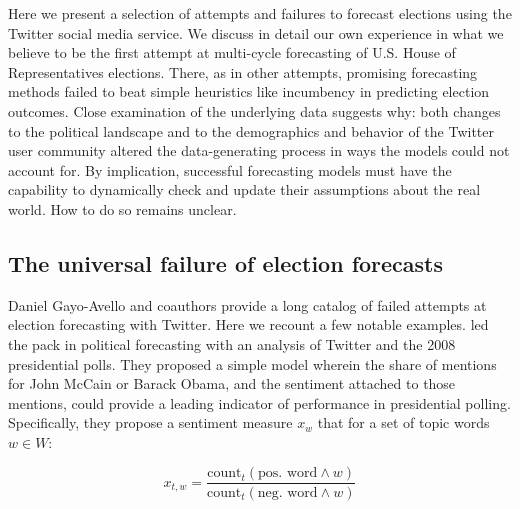 \documentclass{article}
\begin{document}
Here we present a selection of attempts and failures to forecast
elections using the Twitter social media service. We discuss in detail
our own experience in what we believe to be the first attempt at
multi-cycle forecasting of U.S. House of Representatives
elections. There, as in other attempts, promising forecasting methods
failed to beat simple heuristics like incumbency in predicting
election outcomes. Close examination of the underlying data suggests
why: both changes to the political landscape and to the demographics
and behavior of the Twitter user community altered the data-generating
process in ways the models could not account for. By implication,
successful forecasting models must have the capability to dynamically
check and update their assumptions about the real world. How to do so
remains unclear. 





\subsection{The universal failure of election forecasts}
\label{sec:univ-fail-elect}

Daniel Gayo-Avello and coauthors \citep{gayo2011limits,metaxas2011not}
provide a long catalog of failed attempts at election forecasting with
Twitter. Here we recount a few notable examples. \cite{o2010tweets}
led the pack in political forecasting with an analysis of Twitter and
the 2008 presidential polls. They proposed a simple model wherein the
share of mentions for John McCain or Barack Obama, and the sentiment
attached to those mentions, could provide a leading indicator of
performance in presidential polling. Specifically, they propose a
sentiment measure $x_w$ that for a set of topic words $w \in W$:

\begin{equation}
  \label{eq:2}
  x_{t,w} = \frac{\textrm{count}_t(\textrm{pos. word} \wedge w)}{\textrm{count}_t(\textrm{neg. word} \wedge w)}
\end{equation}
\end{document}
